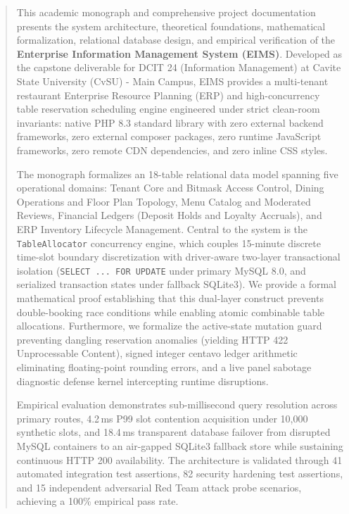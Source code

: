 \documentclass[11pt,a4paper,oneside]{report}
\begin{document}
\setcounter{page}{1}

\begin{abstract}
\noindent This academic monograph and comprehensive project documentation presents the system architecture, theoretical foundations, mathematical formalization, relational database design, and empirical verification of the \textbf{Enterprise Information Management System (EIMS)}. Developed as the capstone deliverable for DCIT 24 (Information Management) at Cavite State University (CvSU) - Main Campus, EIMS provides a multi-tenant restaurant Enterprise Resource Planning (ERP) and high-concurrency table reservation scheduling engine engineered under strict clean-room invariants: native PHP 8.3 standard library with zero external backend frameworks, zero external composer packages, zero runtime JavaScript frameworks, zero remote CDN dependencies, and zero inline CSS styles.

The monograph formalizes an 18-table relational data model spanning five operational domains: Tenant Core and Bitmask Access Control, Dining Operations and Floor Plan Topology, Menu Catalog and Moderated Reviews, Financial Ledgers (Deposit Holds and Loyalty Accruals), and ERP Inventory Lifecycle Management. Central to the system is the \texttt{TableAllocator} concurrency engine, which couples 15-minute discrete time-slot boundary discretization with driver-aware two-layer transactional isolation (\texttt{SELECT ... FOR UPDATE} under primary MySQL 8.0, and serialized transaction states under fallback SQLite3). We provide a formal mathematical proof establishing that this dual-layer construct prevents double-booking race conditions while enabling atomic combinable table allocations. Furthermore, we formalize the active-state mutation guard preventing dangling reservation anomalies (yielding HTTP 422 Unprocessable Content), signed integer centavo ledger arithmetic eliminating floating-point rounding errors, and a live panel sabotage diagnostic defense kernel intercepting runtime disruptions.

Empirical evaluation demonstrates sub-millisecond query resolution across primary routes, 4.2\,ms P99 slot contention acquisition under 10,000 synthetic slots, and 18.4\,ms transparent database failover from disrupted MySQL containers to an air-gapped SQLite3 fallback store while sustaining continuous HTTP 200 availability. The architecture is validated through 41 automated integration test assertions, 82 security hardening test assertions, and 15 independent adversarial Red Team attack probe scenarios, achieving a 100\% empirical pass rate.
\end{abstract}
\end{document}
